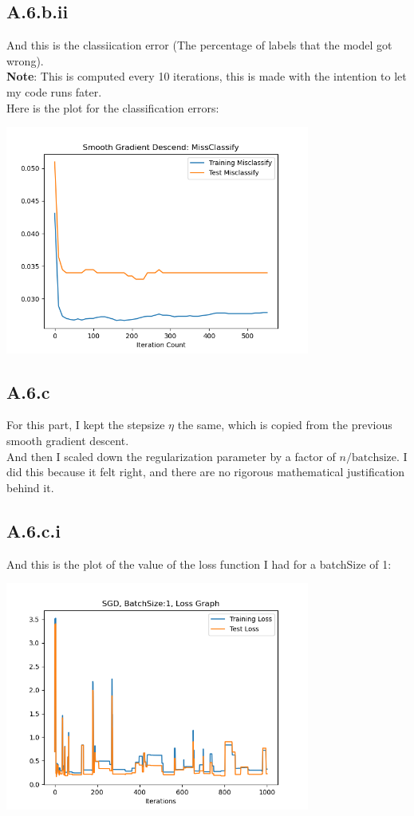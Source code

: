 \documentclass[]{article}
\begin{document}
    \subsection*{A.6.b.ii}
        And this is the classiication error (The percentage of labels that the model got wrong). 
        \\
        \textbf{Note}: This is computed every 10 iterations, this is made with the intention to let my code runs fater.
        \\
        Here is the plot for the classification errors: 
        \begin{center}
            \includegraphics[width=10cm]{A6-smooth-classification.png}
        \end{center}

    \subsection*{A.6.c}\label{sec:A.6.c}
        For this part, I kept the stepsize $\eta$ the same, which is copied from the previous smooth gradient descent. 
        \\
        And then I scaled down the regularization parameter by a factor of $n/\text{batchsize}$. I did this because it felt right, and there are no rigorous mathematical justification behind it. 
    \subsection*{A.6.c.i}
        And this is the plot of the value of the loss function I had for a batchSize of 1: 
        \begin{center}
            \includegraphics[width=10cm]{A6-sgd-1-loss.png}
        \end{center}
\end{document}
